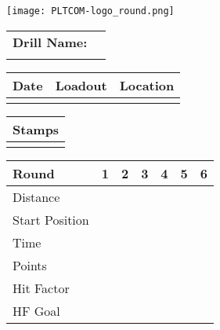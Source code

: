 \documentclass[../Cover.tex]{subfiles}
\begin{document}
	\begin{minipage}[t][0.15\textheight][t]{0.1\textwidth} 
		\texttt{[image: PLTCOM-logo\_round.png]}
	\end{minipage}
	\hfill
	\begin{minipage}[t][0.15\textheight][t]{0.8\textwidth}
		\begin{tabular}{ p{} l  }
			\\		
			\textbf{Drill Name:} \\
			\\[0.03\textheight]
			\hline
		\end{tabular}
		\quad
		\small \begin{tabular}{ | p{} | p{} | p{} |}
			\hline
			\rowcolor[HTML]{C0C0C0}Date & Loadout & Location\\ 
			\hline
			&  &  \\ 
			\hline
		\end{tabular}
	\end{minipage}
	
	\begin{tabular}{p{}|}
		Stamps \\
		\hline
		\\[0.65\textheight]
	\end{tabular}
	\quad
	\begin{tabular}{ | p{} | p{} | p{} | p{} | p{} | p{} | p{} |}
		\hline
		\rowcolor[HTML]{C0C0C0}Round & 1 & 2 & 3 & 4 & 5 & 6 \\
		\hline
		\cellcolor[HTML]{C0C0C0}\tiny Distance & & & & & & \\[0.05\textheight]
		\hline
		\cellcolor[HTML]{C0C0C0}\tiny Start Position & & & & & & \\[0.05\textheight]
		\hline
		\cellcolor[HTML]{C0C0C0}\tiny Time & & & & & & \\[0.05\textheight]
		\hline
		\cellcolor[HTML]{C0C0C0}\tiny Points & & & & & & \\[0.05\textheight]
		\hline
		\cellcolor[HTML]{C0C0C0}\tiny Hit Factor & & & & & & \\[0.05\textheight]
		\hline
		\cellcolor[HTML]{C0C0C0}\tiny HF Goal & & & & & & \\[0.05\textheight]
		\hline
	\end{tabular}
\end{document}
